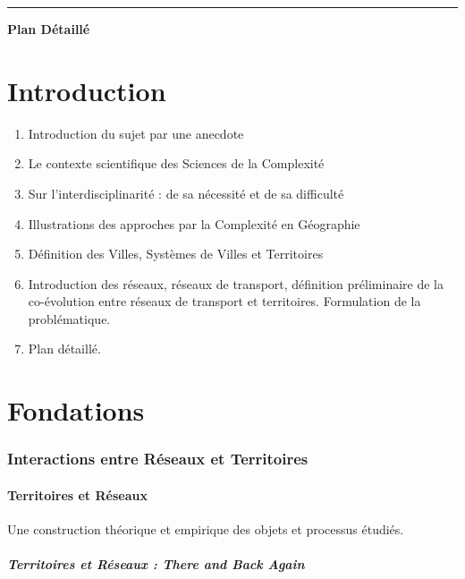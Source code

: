 \hrule

\vspace{0.5cm}

{\hfill
\Huge \textbf{Plan Détaillé}\hfill
}

\vspace{1.5cm}

\part*{Introduction}

\begin{enumerate}
	\item Introduction du sujet par une anecdote
	\item Le contexte scientifique des Sciences de la Complexité
	\item Sur l'interdisciplinarité : de sa nécessité et de sa difficulté
	\item Illustrations des approches par la Complexité en Géographie
	\item Définition des Villes, Systèmes de Villes et Territoires
	\item Introduction des réseaux, réseaux de transport, définition préliminaire de la co-évolution entre réseaux de transport et territoires. Formulation de la problématique.
	\item Plan détaillé.
\end{enumerate}



\part{Fondations}


\section{Interactions entre Réseaux et Territoires}

\subsection{Territoires et Réseaux}

Une construction théorique et empirique des objets et processus étudiés.

\subsubsection{Territoires et Réseaux : \emph{There and Back Again}}

